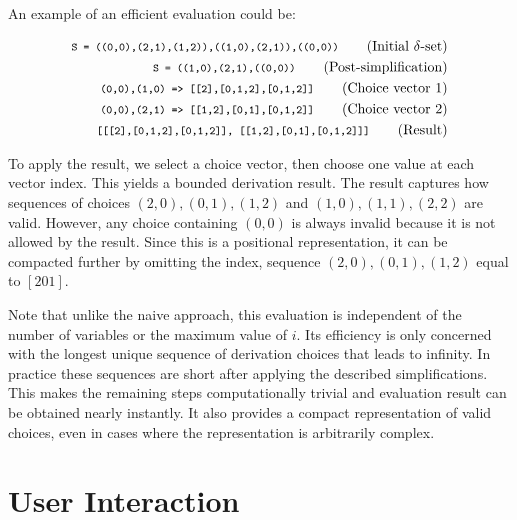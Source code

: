{{    \begin{example}
        \label{ex-fast-eval}
        An example of an efficient evaluation could be:

\begin{align}
\text{\lstinline[basicstyle=\ttfamily\footnotesize]|S = {((0,0),(2,1),(1,2)),((1,0),(2,1)),((0,0))}|} \tag{Initial \(\delta\)-set}\\
\text{\lstinline[basicstyle=\ttfamily\footnotesize]|S = {((1,0),(2,1),((0,0))}|} \tag{Post-simplification}\\
\text{\lstinline[basicstyle=\ttfamily\footnotesize]|(0,0),(1,0) => [[2],[0,1,2],[0,1,2]]|} \tag{Choice vector 1}\\
\text{\lstinline[basicstyle=\ttfamily\footnotesize]|(0,0),(2,1) => [[1,2],[0,1],[0,1,2]]|} \tag{Choice vector 2}\\
\text{\lstinline[basicstyle=\ttfamily\footnotesize]|[[[2],[0,1,2],[0,1,2]], [[1,2],[0,1],[0,1,2]]]|} \tag{Result}
\end{align}

        To apply the result, we select a choice vector, then choose one value at each vector index. This yields a bounded
        derivation result. The result captures how \eg sequences of choices $(2,0),(0,1),(1,2)$ and $(1,0),(1,1),(2,2)$ are valid. However, any choice
        containing $(0,0)$ is always invalid because it is not allowed by the result. Since this is a positional representation,
        it can be compacted further by omitting the index, \eg sequence $(2,0),(0,1),(1,2)$ equal to $[2 0 1]$.
    \end{example}

    Note that unlike the naive approach, this evaluation is independent of the number of variables or the maximum value of $i$.
    Its efficiency is only concerned with the longest unique sequence of derivation choices that
    leads to infinity. In practice these sequences are short after applying the described simplifications.
    This makes the remaining steps computationally trivial and evaluation result can be obtained nearly instantly.
    It also provides a compact representation of valid choices, even in cases where the representation is arbitrarily complex.


    \section{User Interaction}
    \label{sec:use}

}}
